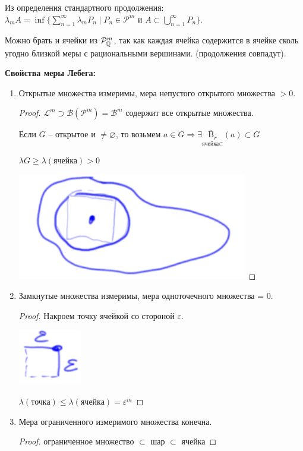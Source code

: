 \begin{remark}
    Из определения стандартного продолжения: $\lambda_m A = \inf \{\sum\limits_{n=1}^\infty \lambda_m P_n \mid P_n\in \mathcal{P}^m\text{ и } A\subset \bigcup\limits_{n=1}^\infty P_n \}$.

    Можно брать и ячейки из $\mathcal{P}^m_{\mathbb{Q}}$, так как каждая ячейка содержится в ячейке сколь угодно близкой меры с рациональными вершинами. (продолжения совпадут).
\end{remark}

\textbf{Свойства меры Лебега:}
\begin{enumerate}
    \item Открытые множества измеримы, мера непустого открытого множества $>0$.
    
    \begin{proof}
        $\mathcal{L}^m\supset \mathcal{B}(\mathcal{P}^m)=\mathcal{B}^m$ содержит все открытые множества.

        Если $G$ – открытое и $\not = \varnothing$, то возьмем $a\in G\Rightarrow
        \exists \underset{\text{ячейка}\subset}{\overline{\text{B}}_r}(a)\subset G$

        $\lambda G\geq \lambda (\text{ячейка})>0$

        \includegraphics[width=0.15\linewidth]{images/23-09-21-2.png}
    \end{proof}
    \item Замкнутые множества измеримы, мера одноточечного множества = 0.
    
    \begin{proof}
        Накроем точку ячейкой со стороной $\varepsilon$.

        \includegraphics[width=0.05\linewidth]{images/23-09-21-3.png}
        
        $\lambda(\text{точка})\leq \lambda (\text{ячейка}) =\varepsilon^m$
    \end{proof}

    \item Мера ограниченного измеримого множества конечна.
    
    \begin{proof}
        ограниченное множество $\subset$ шар $\subset$ ячейка
    \end{proof}


\end{enumerate}
